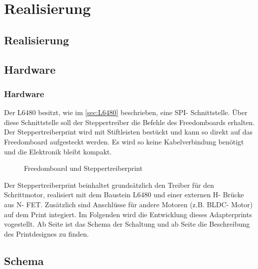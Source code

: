 \ifSTANDALONE
\section{Realisierung}
\fi
\ifEMBED
\subsection{Realisierung}
\fi	
	\ifSTANDALONE
	\subsection{Hardware} \label{ch:Hardware}
	\fi
	\ifEMBED
	\subsubsection{Hardware} \label{ch:Hardware}
	\fi
	Der L6480 besitzt, wie im \autoref{sec:L6480} beschrieben, eine SPI- Schnittstelle. Über diese Schnittstelle soll der Steppertreiber die Befehle des Freedomboards erhalten. Der Steppertreiberprint wird mit Stiftleisten bestückt und kann so direkt auf das Freedomboard aufgesteckt werden. Es wird so keine Kabelverbindung benötigt und die Elektronik bleibt kompakt.
	\begin{figure}[h]
		\centering
		\caption{Freedomboard und Steppertreiberprint}
		\label{fig:Steppertreiber}
	\end{figure}
	\newline
	Der Steppertreiberprint beinhaltet grundsätzlich den Treiber für den Schrittmotor, realisiert mit dem Baustein L6480 und einer externen H- Brücke aus N- FET. Zusätzlich sind Anschlüsse für andere Motoren (z.B. BLDC- Motor) auf dem Print integiert. Im Folgenden wird die Entwicklung dieses Adapterprints vogestellt. Ab Seite \pageref{sec:Schema} ist das Schema der Schaltung und ab Seite \pageref{sec:PrintDesign} die Beschreibung des Printdesignes zu finden. 
	\ifSTANDALONE
	\subsection{Schema} \label{sec:Schema}
	\fi
	\ifEMBED
